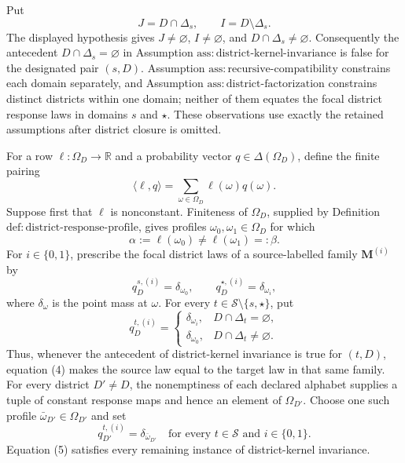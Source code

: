 Put
\[
J=D\cap\Delta_s,
\qquad
I=D\setminus\Delta_s.
\]
The displayed hypothesis gives \(J\ne\varnothing\), \(I\ne\varnothing\), and \(D\cap\Delta_s\ne\varnothing\).  Consequently the antecedent \(D\cap\Delta_s=\varnothing\) in Assumption \(\mathrm{ass:district\text{-}kernel\text{-}invariance}\) is false for the designated pair \((s,D)\).  Assumption \(\mathrm{ass:recursive\text{-}compatibility}\) constrains each domain separately, and Assumption \(\mathrm{ass:district\text{-}factorization}\) constrains distinct districts within one domain; neither of them equates the focal district response laws in domains \(s\) and \(\star\).  These observations use exactly the retained assumptions after district closure is omitted.

For a row \(\ell:\Omega_D\to\mathbb R\) and a probability vector \(q\in\Delta(\Omega_D)\), define the finite pairing
\[
\langle\ell,q\rangle
=\sum_{\omega\in\Omega_D}\ell(\omega)q(\omega).
\tag{1}
\]
Suppose first that \(\ell\) is nonconstant.  Finiteness of \(\Omega_D\), supplied by Definition \(\mathrm{def:district\text{-}response\text{-}profile}\), gives profiles \(\omega_0,\omega_1\in\Omega_D\) for which
\[
\alpha:=\ell(\omega_0)\ne\ell(\omega_1)=:\beta.
\tag{2}
\]
For \(i\in\{0,1\}\), prescribe the focal district laws of a source-labelled family \(\mathbf M^{(i)}\) by
\[
q_D^{s,(i)}=\delta_{\omega_0},
\qquad
q_D^{\star,(i)}=\delta_{\omega_i},
\tag{3}
\]
where \(\delta_\omega\) is the point mass at \(\omega\).  For every \(t\in\mathcal S\setminus\{s,\star\}\), put
\[
q_D^{t,(i)}=
\begin{cases}
\delta_{\omega_i},&D\cap\Delta_t=\varnothing,\\
\delta_{\omega_0},&D\cap\Delta_t\ne\varnothing.
\end{cases}
\tag{4}
\]
Thus, whenever the antecedent of district-kernel invariance is true for \((t,D)\), equation (4) makes the source law equal to the target law in that same family.  For every district \(D'\ne D\), the nonemptiness of each declared alphabet supplies a tuple of constant response maps and hence an element of \(\Omega_{D'}\).  Choose one such profile \(\bar\omega_{D'}\in\Omega_{D'}\) and set
\[
q_{D'}^{t,(i)}=\delta_{\bar\omega_{D'}}
\quad
\text{for every }t\in\mathcal S\text{ and }i\in\{0,1\}.
\tag{5}
\]
Equation (5) satisfies every remaining instance of district-kernel invariance.

